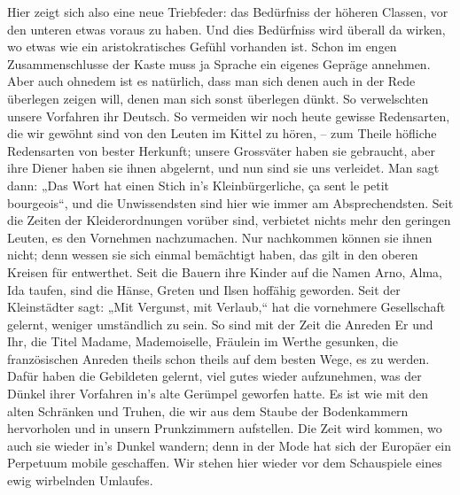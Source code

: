 {Hier zeigt sich also eine neue Triebfeder: das Bedürfniss der höheren Classen, vor den unteren etwas voraus zu haben. Und dies Bedürfniss wird überall da wirken, wo etwas wie ein aristokratisches Gefühl vorhanden ist. Schon im engen Zusammenschlusse der Kaste muss ja  Sprache ein eigenes Gepräge annehmen. Aber auch ohnedem ist es natürlich, dass man sich denen auch in der Rede überlegen zeigen will, denen man sich sonst überlegen dünkt. So verwelschten unsere Vorfahren ihr Deutsch. So vermeiden wir noch heute gewisse Redensarten, die wir gewöhnt sind von den Leuten im Kittel zu hören, – zum Theile höfliche Redensarten von bester Herkunft; unsere Grossväter haben sie gebraucht, aber ihre Diener haben sie ihnen abgelernt, und nun sind sie uns verleidet. Man sagt dann: „Das Wort hat einen Stich in’s Kleinbürgerliche, ça sent le petit bourgeois“, und die Unwissendsten sind hier wie immer \label{sp.250} am Absprechendsten. Seit die Zeiten der Kleiderordnungen vorüber sind, verbietet nichts mehr den geringen Leuten, es den Vornehmen nachzumachen. Nur nachkommen können sie ihnen nicht; denn wessen sie sich einmal bemächtigt haben, das gilt in den oberen Kreisen für entwerthet. Seit die Bauern ihre Kinder auf die Namen Arno, Alma, Ida taufen, sind die Hänse, Greten und Ilsen hoffähig geworden. Seit der Kleinstädter sagt: „Mit Vergunst, mit Verlaub,“ hat die vornehmere \label{fp.247} Gesellschaft gelernt, weniger umständlich zu sein. So sind mit der Zeit die Anreden Er und Ihr, die Titel Madame, Mademoiselle, Fräulein im Werthe gesunken, die französischen Anreden theils schon  theils auf dem besten Wege, es zu werden. Dafür haben die Gebildeten gelernt, viel gutes  wieder aufzunehmen, was der Dünkel ihrer Vorfahren in’s alte Gerümpel geworfen hatte. Es ist wie mit den alten Schränken und Truhen, die wir aus dem Staube der Bodenkammern hervorholen und in unsern Prunkzimmern aufstellen. Die Zeit wird kommen, wo auch sie wieder in’s Dunkel wandern; denn in der Mode hat sich der Europäer ein Perpetuum mobile geschaffen. Wir stehen hier wieder vor dem Schauspiele eines ewig wirbelnden Umlaufes.

\subsection*{}\label{III.II.II.13a}
}
